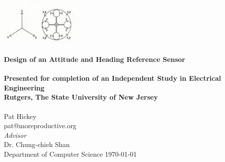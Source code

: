 \begin{titlepage}
\begin{center}

\includegraphics[width=0.3\textwidth]{./cycloid.png}\\[2cm]
\HRule \\[1cm]
{ \huge \bfseries Design of an Attitude and Heading Reference Sensor } \\[1cm]
\HRule \\[0.5cm]
{ \large \bfseries Presented for completion of an Independent Study in Electrical Engineering }
\\[0.5cm]
{ \large \bfseries Rutgers, The State University of New Jersey }
\\[0.5cm]
\HRule \\[1cm]

{\large Pat Hickey}
\\ 
pat@moreproductive.org
\\[0.5cm]
\emph{Advisor}
\\ Dr. Chung-chieh Shan
\\ Department of Computer Science
\vfill
{\large \today}

\end{center}
\end{titlepage}
